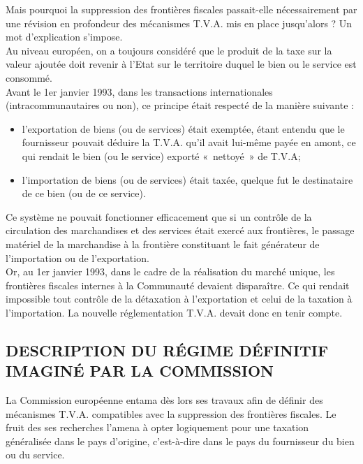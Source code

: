 \documentclass{book}
\begin{document}
Mais pourquoi la suppression des frontières fiscales passait-elle nécessairement par une
révision en profondeur des mécanismes T.V.A. mis en place jusqu'alors ? Un mot
d'explication s'impose.\\

Au niveau européen, on a toujours considéré que le produit de la taxe sur la valeur ajoutée
doit revenir à l'Etat sur le territoire duquel le bien ou le service est consommé.\\

Avant le 1er janvier 1993, dans les transactions internationales (intracommunautaires ou non),
ce principe était respecté de la manière suivante :\\

\begin{itemize}
\item l'exportation de biens (ou de services) était exemptée, étant entendu que le
fournisseur pouvait déduire la T.V.A. qu'il avait lui-même payée en amont, ce qui
rendait le bien (ou le service) exporté «~nettoyé~» de T.V.A;
\item l'importation de biens (ou de services) était taxée, quelque fut le destinataire de ce
bien (ou de ce service).
\end{itemize}

\null

Ce système ne pouvait fonctionner efficacement que si un contrôle de la circulation des
marchandises et des services était exercé aux frontières, le passage matériel de la marchandise
à la frontière constituant le fait générateur de l’importation ou de l’exportation.\\

Or, au 1er janvier 1993, dans le cadre de la réalisation du marché unique, les frontières fiscales
internes à la Communauté devaient disparaître. Ce qui rendait impossible tout contrôle de la
détaxation à l'exportation et celui de la taxation à l'importation. La nouvelle réglementation
T.V.A. devait donc en tenir compte.\\

\subsection{DESCRIPTION DU RÉGIME DÉFINITIF IMAGINÉ PAR LA COMMISSION}

La Commission européenne entama dès lors ses travaux afin de définir des mécanismes
T.V.A. compatibles avec la suppression des frontières fiscales. Le fruit des ses recherches
l’amena à opter logiquement pour une taxation généralisée dans le pays d'origine, c'est-à-dire
dans le pays du fournisseur du bien ou du service.\\
\end{document}
